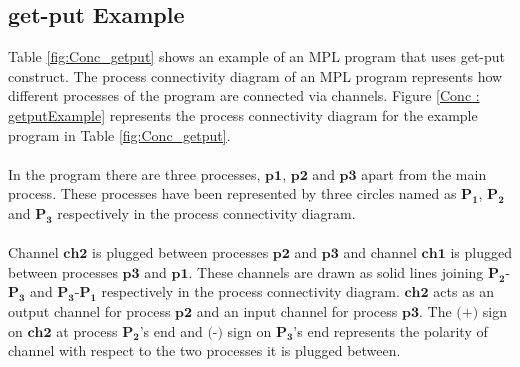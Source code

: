 \documentclass[11pt]{article}
\newcommand{\<}{\langle}
\renewcommand{\>}{\rangle}
\begin{document}
\subsection {get-put Example}
Table \ref {fig:Conc_getput} shows an example of an MPL program that uses {\sf get-put} construct. The process connectivity diagram of an MPL program represents how different processes of the program are connected via channels. Figure \ref {Conc : getputExample} represents the process connectivity diagram for the example program in Table \ref {fig:Conc_getput}.
~~\\~~\\ 
In the program there are three processes, $\mathbf {p1}$, $\mathbf {p2}$ and $\mathbf {p3}$ apart from the main process. These processes have been represented by three circles named as $\mathbf{P_1}$, $\mathbf{P_2}$ and $\mathbf {P_3}$ respectively in the process connectivity diagram.
~~\\~~\\
Channel $\mathbf {ch2}$ is plugged between processes $\mathbf {p2}$ and $\mathbf {p3}$ and channel $\mathbf {ch1}$ is plugged between processes $\mathbf {p3}$ and $\mathbf {p1}$. These channels are drawn as solid lines joining $\mathbf {P_2}$-$\mathbf {P_3}$ and $\mathbf {P_3}$-$\mathbf {P_1}$ respectively in the process connectivity diagram. $\mathbf {ch2}$ acts as an output channel for process $\mathbf {p2}$ and an input channel for process $\mathbf {p3}$. The $\mathbf {\texttt{(+)}}$ sign on $\mathbf {ch2}$ at process $\mathbf {P_2}$'s end and $\mathbf {\texttt{(-)}}$ sign on $\mathbf {P_3}$'s end represents the polarity of channel with respect to the two processes it is plugged between.
\end{document}
